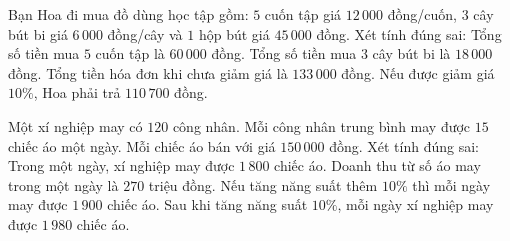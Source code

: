 \begin{ex} %
Bạn Hoa đi mua đồ dùng học tập gồm: $5$ cuốn tập giá $12\,000$ đồng/cuốn, $3$ cây bút bi giá $6\,000$ đồng/cây và $1$ hộp bút giá $45\,000$ đồng. Xét tính đúng sai:
\choiceTF
{\True Tổng số tiền mua $5$ cuốn tập là $60\,000$ đồng.}
{\True Tổng số tiền mua $3$ cây bút bi là $18\,000$ đồng.}
{Tổng tiền hóa đơn khi chưa giảm giá là $133\,000$ đồng.}
{\True Nếu được giảm giá $10\%$, Hoa phải trả $110\,700$ đồng.}
\end{ex}

\begin{ex} %
Một xí nghiệp may có $120$ công nhân. Mỗi công nhân trung bình may được $15$ chiếc áo một ngày. Mỗi chiếc áo bán với giá $150\,000$ đồng. Xét tính đúng sai:
\choiceTF
{\True Trong một ngày, xí nghiệp may được $1\,800$ chiếc áo.}
{\True Doanh thu từ số áo may trong một ngày là $270$ triệu đồng.}
{Nếu tăng năng suất thêm $10\%$ thì mỗi ngày may được $1\,900$ chiếc áo.}
{\True Sau khi tăng năng suất $10\%$, mỗi ngày xí nghiệp may được $1\,980$ chiếc áo.}
\end{ex}

